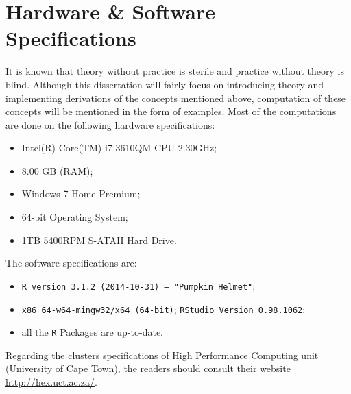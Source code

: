\section{Hardware \& Software Specifications}
It is known that theory without practice is sterile and practice without theory is blind. Although this dissertation will fairly focus on introducing theory and implementing derivations of the concepts mentioned above, computation of these concepts will be mentioned in the form of examples. Most of the computations are done on the following hardware specifications:
\begin{itemize}
\item \textrm{Intel(R) Core(TM) i7-3610QM CPU 2.30GHz};
\item \textrm{8.00 GB (RAM)};
\item \textrm{Windows 7 Home Premium};
\item \textrm{64-bit Operating System};
\item \textrm{1TB 5400RPM S-ATAII Hard Drive}.
\end{itemize}
The software specifications are:
\begin{itemize}
\item \texttt{R version 3.1.2 (2014-10-31) -- "Pumpkin Helmet"};
\item \texttt{x86\_64-w64-mingw32/x64 (64-bit)};
\texttt{RStudio Version 0.98.1062};
\item all the \texttt{R} Packages are up-to-date.
\end{itemize}
Regarding the clusters specifications of High Performance Computing unit (University of Cape Town), the readers should consult their website \href{http://hex.uct.ac.za/}{http://hex.uct.ac.za/}.
%
%
%
